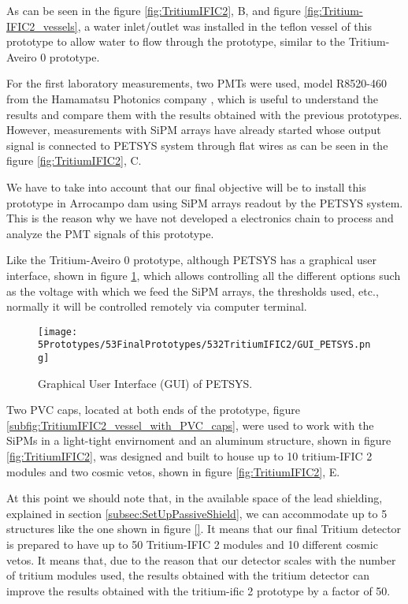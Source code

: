 As can be seen in the figure \ref{fig:TritiumIFIC2}, B, and figure \ref{fig:Tritium-IFIC2_vessels}, a water inlet/outlet was installed in the teflon vessel of this prototype to allow water to flow through the prototype, similar to the Tritium-Aveiro 0 prototype.

For the first laboratory measurements, two PMTs were used, model R8520-460 from the Hamamatsu Photonics company \cite{DataSheetPMTs}, which is useful to understand the results and compare them with the results obtained with the previous prototypes. However, measurements with SiPM arrays have already started whose output signal is connected to PETSYS system through flat wires as can be seen in the figure \ref{fig:TritiumIFIC2}, C.

We have to take into account that our final objective will be to install this prototype in Arrocampo dam using SiPM arrays readout by the PETSYS system. This is the reason why we have not developed a electronics chain to process and analyze the PMT signals of this prototype.

Like the Tritium-Aveiro 0 prototype, although PETSYS has a graphical user interface, shown in figure \ref{fig:GUI_PETSYS}, which allows controlling all the different options such as the voltage with which we feed the SiPM arrays, the thresholds used, etc., normally it will be controlled remotely via computer terminal. 

\begin{figure}[h]
\centering
\texttt{[image: 5Prototypes/53FinalPrototypes/532TritiumIFIC2/GUI\_PETSYS.png]}
\caption{Graphical User Interface (GUI) of PETSYS.\label{fig:GUI_PETSYS}}
\end{figure}

Two PVC caps, located at both ends of the prototype, figure \ref{subfig:TritiumIFIC2_vessel_with_PVC_caps}, were used to work with the SiPMs in a light-tight envirnoment and an aluminum structure, shown in figure \ref{fig:TritiumIFIC2}, was designed and built to house up to 10 tritium-IFIC 2 modules and two cosmic vetos, shown in figure \ref{fig:TritiumIFIC2}, E.

At this point we should note that, in the available space of the lead shielding, explained in section \ref{subsec:SetUpPassiveShield}, we can accommodate up to 5 structures like the one shown in figure \ref{}. It means that our final Tritium detector is prepared to have up to 50 Tritium-IFIC 2 modules and 10 different cosmic vetos. It means that, due to the reason that our detector scales with the number of tritium modules used, the results obtained with the tritium detector can improve the results obtained with the tritium-ific 2 prototype by a factor of 50.

